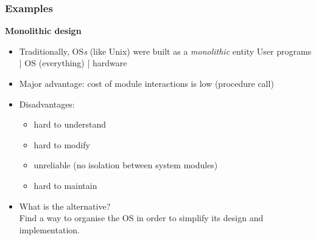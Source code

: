 \documentclass[11pt,a4paper]{article}
\begin{document}
\subsubsection{Examples}

\textbf{Monolithic design}
\begin{itemize}
    \item Traditionally, OS\emph{s} (like Unix) were built as a \emph{monolithic} entity
        User programs | OS (everything) | hardware
    \item Major advantage: cost of module interactions is low (procedure call)
    \item Disadvantages:
        \begin{itemize}
            \item hard to understand
            \item hard to modify
            \item unreliable (no isolation between system modules)
            \item hard to maintain
        \end{itemize}
    \item What is the alternative? \\
        Find a way to organise the OS in order to simplify its design and implementation.
\end{itemize}
\end{document}
